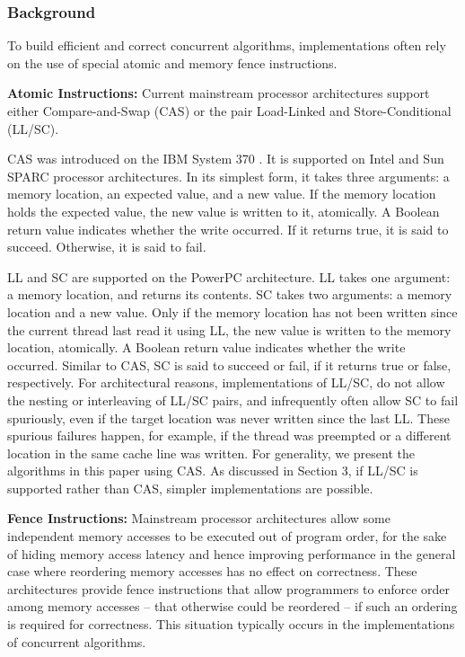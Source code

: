 \subsubsection{Background}


To build efficient and correct concurrent algorithms, implementations
often rely on the use of special atomic and memory fence instructions.

\textbf{Atomic Instructions:} Current mainstream processor
architectures support either Compare-and-Swap (CAS) or the pair
Load-Linked and Store-Conditional (LL/SC).

CAS was introduced on the IBM System 370 \cite{IBM1974}. It is
supported on Intel and Sun SPARC processor architectures. In its
simplest form, it takes three arguments: a memory location, an
expected value, and a new value. If the memory location holds the
expected value, the new value is written to it, atomically. A Boolean
return value indicates whether the write occurred. If it returns true,
it is said to succeed. Otherwise, it is said to fail.

LL and SC are supported on the PowerPC architecture. LL takes one
argument: a memory location, and returns its contents. SC takes two
arguments: a memory location and a new value. Only if the memory
location has not been written since the current thread last read it
using LL, the new value is written to the memory location,
atomically. A Boolean return value indicates whether the write
occurred. Similar to CAS, SC is said to succeed or fail, if it returns
true or false, respectively. For architectural reasons,
implementations of LL/SC, do not allow the nesting or interleaving of
LL/SC pairs, and infrequently often allow SC to fail spuriously, even
if the target location was never written since the last LL. These
spurious failures happen, for example, if the thread was preempted or
a different location in the same cache line was written. For
generality, we present the algorithms in this paper using CAS. As
discussed in Section 3, if LL/SC is supported rather than CAS, simpler
implementations are possible.

\textbf{Fence Instructions:} Mainstream processor architectures allow
some independent memory accesses to be executed out of program order,
for the sake of hiding memory access latency and hence improving
performance in the general case where reordering memory accesses has
no effect on correctness. These architectures provide fence
instructions that allow programmers to enforce order among memory
accesses -- that otherwise could be reordered -- if such an ordering
is required for correctness. This situation typically occurs in the
implementations of concurrent algorithms.

